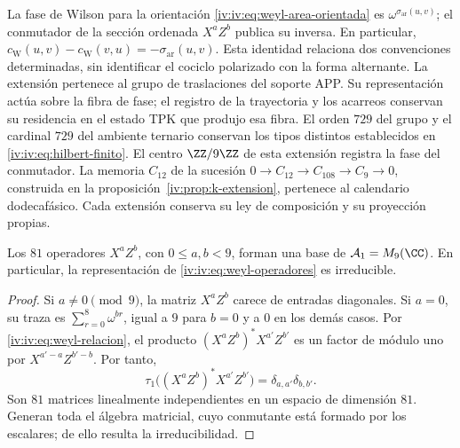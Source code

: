 La fase de Wilson para la orientación
\eqref{iv:iv:eq:weyl-area-orientada} es
\(\omega^{\sigma_{\mathrm{ar}}(u,v)}\); el conmutador de la
sección ordenada \(X^aZ^b\) publica su inversa. En particular,
\(c_{\mathrm W}(u,v)-c_{\mathrm W}(v,u)
=-\sigma_{\mathrm{ar}}(u,v)\).
Esta identidad relaciona dos convenciones determinadas, sin identificar
el cociclo polarizado con la forma alternante. La extensión pertenece
al grupo de traslaciones del soporte APP. Su representación actúa sobre
la fibra de fase; el registro de la trayectoria y los acarreos conservan
su residencia en el estado TPK que produjo esa fibra. El orden \(729\)
del grupo y el cardinal \(729\) del ambiente ternario conservan los
tipos distintos establecidos en \eqref{iv:iv:eq:hilbert-finito}.
El centro \(\ZZ/9\ZZ\) de esta extensión registra la fase
del conmutador. La memoria \(C_{12}\) de la sucesión
\(0\to C_{12}\to C_{108}\to C_9\to0\), construida en la
proposición~\ref{iv:prop:k-extension}, pertenece al calendario
dodecafásico. Cada extensión conserva su ley de composición y
su proyección propias.

\begin{proposition}
\label{iv:iv:prop:weyl-completo}
Los \(81\) operadores \(X^aZ^b\), con \(0\leq a,b<9\), forman
una base de \(\mathcal A_1=M_9(\CC)\). En particular, la
representación de \eqref{iv:iv:eq:weyl-operadores} es irreducible.
\end{proposition}
\begin{proof}
Si \(a\neq0\pmod9\), la matriz \(X^aZ^b\) carece de entradas
diagonales. Si \(a=0\), su traza es
\(\sum_{r=0}^8\omega^{br}\), igual a \(9\) para \(b=0\) y a
\(0\) en los demás casos. Por \eqref{iv:iv:eq:weyl-relacion}, el
producto \((X^aZ^b)^*X^{a'}Z^{b'}\) es un factor de módulo uno
por \(X^{a'-a}Z^{b'-b}\). Por tanto,
\[
 \tau_1\bigl((X^aZ^b)^*X^{a'}Z^{b'}\bigr)
 =\delta_{a,a'}\delta_{b,b'}.
\]
Son \(81\) matrices linealmente independientes en un espacio de
dimensión \(81\). Generan toda el álgebra matricial, cuyo conmutante
está formado por los escalares; de ello resulta la irreducibilidad.
\end{proof}

